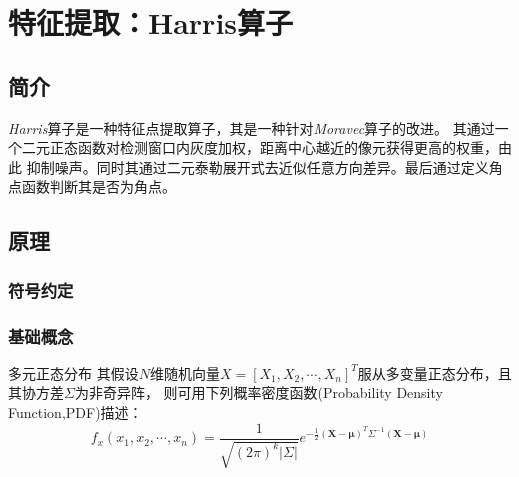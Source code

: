 
\newpage
\section{特征提取：Harris算子}
\subsection{简介}
    \textit{Harris}算子是一种特征点提取算子，其是一种针对\textit{Moravec}算子的改进。
    其通过一个二元正态函数对检测窗口内灰度加权，距离中心越近的像元获得更高的权重，由此
    抑制噪声。同时其通过二元泰勒展开式去近似任意方向差异。最后通过定义角点函数判断其是否为角点。
\subsection{原理}
    \subsubsection{符号约定}
    \begin{table}[H]
        \centering
        \caption{符号约定}
        \label{harris_symbol}
    \end{table}

    \subsubsection{基础概念}
        \begin{theorem}{多元正态分布}
            其假设$N$维随机向量$X=[X_1,X_2, \cdots ,X_n]^T$服从多变量正态分布，且其协方差$\Sigma$为非奇异阵，
            则可用下列概率密度函数(Probability Density Function,PDF)描述：
            \begin{equation}
                \label{normalpdf}
                f_x(x_1,x_2, \cdots ,x_n)=\frac{1}{\sqrt{(2\pi)^k |\Sigma|}}e^{-\frac{1}{2}(\bm{X}-\bm{\mu})^T \Sigma^{-1}(\bm{X}-\bm{\mu})  }              
            \end{equation}
        \end{theorem}

